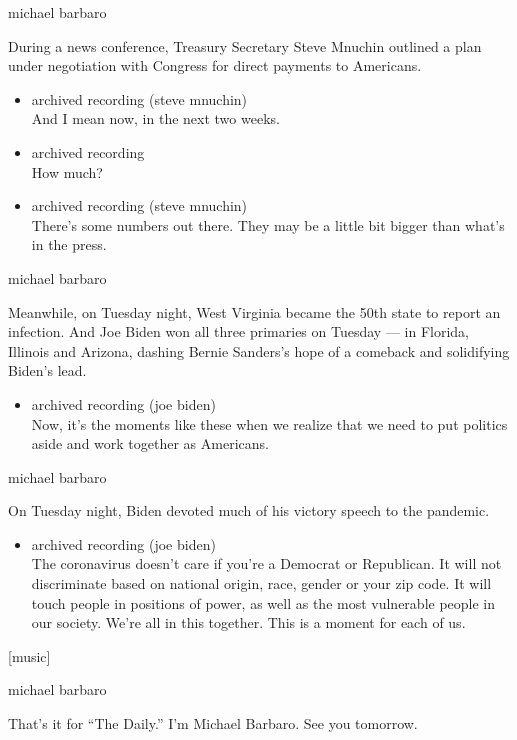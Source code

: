 michael barbaro

During a news conference, Treasury Secretary Steve Mnuchin outlined a
plan under negotiation with Congress for direct payments to Americans.

\begin{itemize}
\item
  archived recording (steve mnuchin)\\
  And I mean now, in the next two weeks.
\item
  archived recording\\
  How much?
\item
  archived recording (steve mnuchin)\\
  There's some numbers out there. They may be a little bit bigger than
  what's in the press.
\end{itemize}

michael barbaro

Meanwhile, on Tuesday night, West Virginia became the 50th state to
report an infection. And Joe Biden won all three primaries on Tuesday
--- in Florida, Illinois and Arizona, dashing Bernie Sanders's hope of a
comeback and solidifying Biden's lead.

\begin{itemize}
\tightlist
\item
  archived recording (joe biden)\\
  Now, it's the moments like these when we realize that we need to put
  politics aside and work together as Americans.
\end{itemize}

michael barbaro

On Tuesday night, Biden devoted much of his victory speech to the
pandemic.

\begin{itemize}
\tightlist
\item
  archived recording (joe biden)\\
  The coronavirus doesn't care if you're a Democrat or Republican. It
  will not discriminate based on national origin, race, gender or your
  zip code. It will touch people in positions of power, as well as the
  most vulnerable people in our society. We're all in this together.
  This is a moment for each of us.
\end{itemize}

{[}music{]}

michael barbaro

That's it for ``The Daily.'' I'm Michael Barbaro. See you tomorrow.

